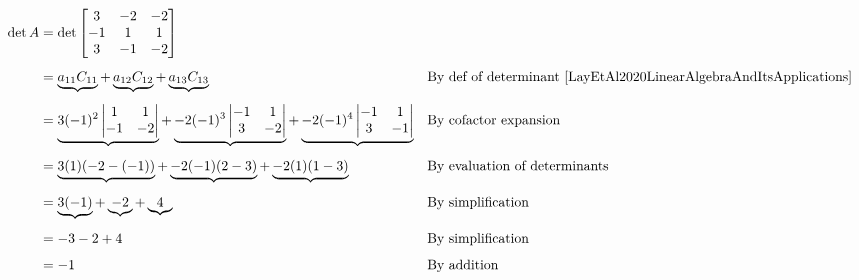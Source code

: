 \documentclass[10pt,letterpaper,final]{report}
\newcommand{\reason}[1]{&& \text{#1}}
\begin{document}
\begin{align*}
  \det A & = \det \begin{bmatrix}
                    3  & -2 & -2 \\
                    -1 & 1  & 1  \\
                    3  & -1 & -2
                  \end{bmatrix}                                                                                                                                                                                                                       \\[1ex]
         & = \underbrace{a_{11}C_{11}} + \underbrace{a_{12}C_{12}} + \underbrace{a_{13}C_{13}} \reason{By def of determinant \cite[Ch. 3.1, p.173]{LayEtAl2020LinearAlgebraAndItsApplications}}                                                          \\[1ex]
         & = \underbrace{3(-1)^2\begin{vmatrix}1 & 1 \\ -1 & -2\end{vmatrix}} + \underbrace{-2 (-1)^3 \begin{vmatrix}-1 & 1 \\ 3 & -2\end{vmatrix}} + \underbrace{-2 (-1)^4 \begin{vmatrix}-1 & 1 \\ 3 & -1\end{vmatrix}} \reason{By cofactor expansion} \\[1ex]
         & = \underbrace{3(1)(-2 - (-1))} + \underbrace{-2 (-1) (2 - 3) } + \underbrace{-2 (1) (1 - 3) } \reason{By evaluation of determinants}                                                                                                          \\[1ex]
         & = \underbrace{3(-1)} + \underbrace{-2} + \underbrace{4} \reason{By simplification}                                                                                                                                                            \\[1ex]
         & = -3 -2 + 4 \reason{By simplification}                                                                                                                                                                                                        \\[1ex]
         & = -1 \reason{By addition}
\end{align*}
\end{document}
